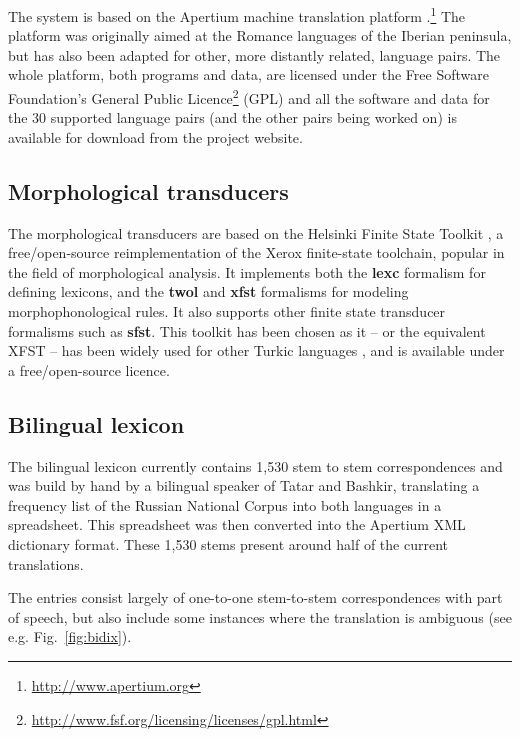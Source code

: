 \documentclass[11pt,a4paper]{article}
\begin{document}
The system is based on the Apertium machine translation platform \cite{apertium/2011}.\footnote{\url{http://www.apertium.org}} The 
platform was originally aimed at the Romance languages of the Iberian peninsula, but has also been adapted for 
other, more distantly related, language pairs.
The whole platform, both programs and data, are licensed under the Free Software Foundation's General Public 
Licence\footnote{\url{http://www.fsf.org/licensing/licenses/gpl.html}} (GPL) and all the software and data for the 
30 supported language pairs (and the other pairs being worked on) is available for download from the project 
website.

\subsection{Morphological transducers}

The morphological transducers are based on the Helsinki Finite State Toolkit \cite{hfst/2011}, a 
free/open-source reimplementation of the Xerox finite-state toolchain, popular in the field of 
morphological analysis. It implements both the \textbf{lexc} formalism for defining lexicons, 
and the \textbf{twol} and \textbf{xfst} formalisms for modeling morphophonological rules. It 
also supports other finite state transducer formalisms such as \textbf{sfst}. This toolkit has 
been chosen as it -- or the equivalent XFST -- has been widely used for 
other Turkic languages \cite{coltekin2010,altintas2001,tantug2006}, 
and is available under a free/open-source licence.

\subsection{Bilingual lexicon}

The bilingual lexicon currently contains 1,530 stem to stem correspondences and was build by hand by a bilingual 
speaker of Tatar and Bashkir, translating a frequency list of the Russian National Corpus \cite{rnc} 
into both languages in a spreadsheet. This spreadsheet was then converted into the Apertium
XML dictionary format. These 1,530 stems present around half of the current translations.

The entries consist largely of one-to-one stem-to-stem correspondences with part of speech, but also
include some instances where the translation is ambiguous (see e.g. Fig.~\ref{fig:bidix}).
\end{document}
